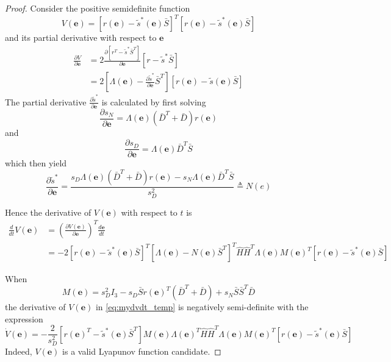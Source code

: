 \documentclass[times]{rncauth}
\begin{document}
\renewcommand{\proofname}{Proof of Theorem \ref{thm:stable}}
\begin{proof}
Consider the positive semidefinite function
\begin{equation}\label{eq:laypu_three}
V(\mathbf{e})=[r(\mathbf{e})-\tilde{s}^*(\mathbf{e})\bar{S}]^T[r(\mathbf{e})-\tilde{s}^*(\mathbf{e})\bar{S}]
\end{equation}
and its partial derivative with respect to $\mathbf{e}$
\begin{align}
  \frac{\partial V}{\partial \mathbf{e}}&=2\frac{\partial [r^T-\tilde{s}^*\bar{S}^T]}{\partial
  \mathbf{e}}[r-\tilde{s}^*\bar{S}]\nonumber\\
  &=2[\Lambda(\mathbf{e})-\frac{\partial \tilde{s}^*}{\partial
  \mathbf{e}}\bar{S}^T][r(\mathbf{e})-\tilde{s}(\mathbf{e})\bar{S}]\label{eq:dvde}
\end{align}
The partial derivative $\frac{\partial \tilde{s}^*}{\partial
\mathbf{e}}$ is calculated by first solving
\begin{equation*}
  \frac{\partial s_N}{\partial \mathbf{e}}= \Lambda(\mathbf{e}) (\bar{D}^T+\bar{D})
  r(\mathbf{e})
  \end{equation*}
  and \begin{equation*}
  \frac{\partial s_D}{\partial \mathbf{e}}=\Lambda(\mathbf{e}) \bar{D}^T \bar{S}
\end{equation*}
which then yield
\begin{equation}
\frac{\partial \tilde{s}^*}{\partial \mathbf{e}}=\frac{s_D
\Lambda(\mathbf{e}) (\bar{D}^T+\bar{D}) r(\mathbf{e})-s_N
\Lambda(\mathbf{e})\bar{D}^T \bar{S}}{s_D^2}\triangleq N(e)
\end{equation}

Hence the derivative of $V(\mathbf{e})$ with respect to $t$ is
\begin{align}
  \frac{d}{dt}V(\mathbf{e})&=(\frac{\partial V(\mathbf{e})}{\partial \mathbf{e}})^T \frac{d
  \mathbf{e}}{dt}\nonumber\\
  &=-2[r(\mathbf{e})-\tilde{s}^*(\mathbf{e})\bar{S}]^T[\Lambda(\mathbf{e})-N(\mathbf{e})\bar{S}^T]^T \hat{H} \hat{H} ^T \Lambda(\mathbf{e})
M(\mathbf{e})^T[r(\mathbf{e})-\tilde{s}^*(\mathbf{e})\bar{S}]\label{eq:mydvdt_temp}
\end{align}


 When
\begin{equation}\label{eq:myMM}
  M(\mathbf{e})=s_D^2 I_3-s_D \bar{S} r(\mathbf{e})^T(\bar{D}^T+\bar{D}) + s_N
  \bar{S} \bar{S}^T \bar{D}
\end{equation}
the derivative of $V(\mathbf{e})$ in \eqref{eq:mydvdt_temp} is
negatively semi-definite with the expression
\begin{equation}
\dot{V}(\mathbf{e})=-\frac{2}{s_D^2}[r(\mathbf{e})^T-\tilde{s}^*(\mathbf{e})\bar{S}^T]M(\mathbf{e})\Lambda(\mathbf{e})^T\hat{H}\hat{H}
^T\Lambda(\mathbf{e})M(\mathbf{e})^T[r(\mathbf{e})-\tilde{s}^*(\mathbf{e})\bar{S}]
\end{equation}
Indeed, $V(\mathbf{e})$ is a valid Lyapunov function candidate.



\end{proof}
\end{document}
